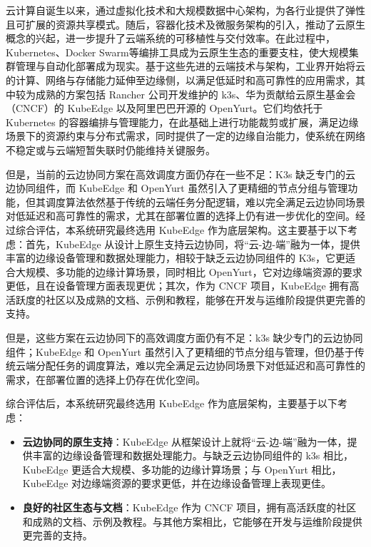 云计算自诞生以来，通过虚拟化技术和大规模数据中心架构，为各行业提供了弹性且可扩展的资源共享模式。随后，容器化技术及微服务架构的引入，推动了云原生概念的兴起，进一步提升了云端系统的可移植性与交付效率\cite{deng2024cloud}。在此过程中，Kubernetes\cite{kubernetes}、Docker Swarm\cite{dockerswarm}等编排工具成为云原生生态的重要支柱，使大规模集群管理与自动化部署成为现实。基于这些先进的云端技术与架构，工业界开始将云的计算、网络与存储能力延伸至边缘侧，以满足低延时和高可靠性的应用需求，其中较为成熟的方案包括 Rancher 公司开发维护的 k3s\cite{fogli2021performance}、华为贡献给云原生基金会（CNCF）的 KubeEdge\cite{xiong2018extend} 以及阿里巴巴开源的 OpenYurt\cite{openyurt2023}。它们均依托于 Kubernetes 的容器编排与管理能力，在此基础上进行功能裁剪或扩展，满足边缘场景下的资源约束与分布式需求，同时提供了一定的边缘自治能力，使系统在网络不稳定或与云端短暂失联时仍能维持关键服务。

但是，当前的云边协同方案在高效调度方面仍存在一些不足：K3s 缺乏专门的云边协同组件，而 KubeEdge 和 OpenYurt 虽然引入了更精细的节点分组与管理功能，但其调度算法依然基于传统的云端任务分配逻辑，难以完全满足云边协同场景对低延迟和高可靠性的需求，尤其在部署位置的选择上仍有进一步优化的空间。经过综合评估，本系统研究最终选用 KubeEdge 作为底层架构。这主要基于以下考虑：首先，KubeEdge 从设计上原生支持云边协同，将“云-边-端”融为一体，提供丰富的边缘设备管理和数据处理能力，相较于缺乏云边协同组件的 K3s，它更适合大规模、多功能的边缘计算场景，同时相比 OpenYurt，它对边缘端资源的要求更低，且在设备管理方面表现更优；其次，作为 CNCF 项目，KubeEdge 拥有高活跃度的社区以及成熟的文档、示例和教程，能够在开发与运维阶段提供更完善的支持。

但是，这些方案在云边协同下的高效调度方面仍有不足：k3s 缺少专门的云边协同组件；KubeEdge 和 OpenYurt 虽然引入了更精细的节点分组与管理，但仍基于传统云端分配任务的调度算法，难以完全满足云边协同场景下对低延迟和高可靠性的需求，在部署位置的选择上仍存在优化空间。

综合评估后，本系统研究最终选用 KubeEdge 作为底层架构，主要基于以下考虑：

\begin{itemize} 
\item \textbf{云边协同的原生支持}：KubeEdge 从框架设计上就将“云-边-端”融为一体，提供丰富的边缘设备管理和数据处理能力。与缺乏云边协同组件的 k3s 相比，KubeEdge 更适合大规模、多功能的边缘计算场景；与 OpenYurt 相比，KubeEdge 对边缘端资源的要求更低，并在边缘设备管理上表现更佳。
\item \textbf{良好的社区生态与文档}：KubeEdge 作为 CNCF 项目，拥有高活跃度的社区和成熟的文档、示例及教程。与其他方案相比，它能够在开发与运维阶段提供更完善的支持。 
\end{itemize}

